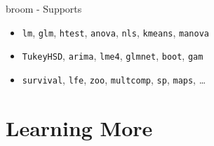 \begin{frame}{broom - Supports}

\begin{itemize}
\itemsep1pt\parskip0pt
\item
  \texttt{lm}, \texttt{glm}, \texttt{htest}, \texttt{anova},
  \texttt{nls}, \texttt{kmeans}, \texttt{manova}
\item
  \texttt{TukeyHSD}, \texttt{arima}, \texttt{lme4}, \texttt{glmnet},
  \texttt{boot}, \texttt{gam}
\item
  \texttt{survival}, \texttt{lfe}, \texttt{zoo}, \texttt{multcomp},
  \texttt{sp}, \texttt{maps}, \ldots
\end{itemize}

\end{frame}

\section{Learning More}\label{learning-more}
